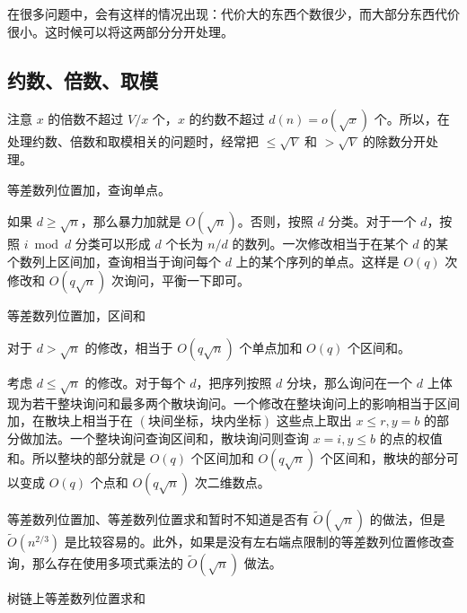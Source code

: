在很多问题中，会有这样的情况出现：代价大的东西个数很少，而大部分东西代价很小。这时候可以将这两部分分开处理。

\subsection{约数、倍数、取模}

注意 $x$ 的倍数不超过 $V/x$ 个，$x$ 的约数不超过 $d(n) = o(\sqrt x)$ 个。所以，在处理约数、倍数和取模相关的问题时，经常把 $\le \sqrt{V}$ 和 $>\sqrt{V}$ 的除数分开处理。

\begin{example}
    等差数列位置加，查询单点。
\end{example}
\begin{solution}
    如果 $d\ge \sqrt{n}$，那么暴力加就是 $O(\sqrt{n})$。否则，按照 $d$ 分类。对于一个 $d$，按照 $i\bmod d$ 分类可以形成 $d$ 个长为 $n/d$ 的数列。一次修改相当于在某个 $d$ 的某个数列上区间加，查询相当于询问每个 $d$ 上的某个序列的单点。这样是 $O(q)$ 次修改和 $O(q\sqrt{n})$ 次询问，平衡一下即可。
\end{solution}
\begin{example}[P5309 强化版]
    等差数列位置加，区间和
\end{example}
\begin{solution}
    对于 $d>\sqrt{n}$ 的修改，相当于 $O(q\sqrt{n})$ 个单点加和 $O(q)$ 个区间和。
    
    考虑 $d\le \sqrt{n}$ 的修改。对于每个 $d$，把序列按照 $d$ 分块，那么询问在一个 $d$ 上体现为若干整块询问和最多两个散块询问。一个修改在整块询问上的影响相当于区间加，在散块上相当于在 $(\text{块间坐标，块内坐标})$ 这些点上取出 $x\le r,y=b$ 的部分做加法。一个整块询问查询区间和，散块询问则查询 $x=i,y\le b$ 的点的权值和。所以整块的部分就是 $O(q)$ 个区间加和 $O(q\sqrt{n})$ 个区间和，散块的部分可以变成 $O(q)$ 个点和 $O(q\sqrt{n})$ 次二维数点。
\end{solution}
\begin{remark}
    等差数列位置加、等差数列位置求和暂时不知道是否有 $\tilde O(\sqrt{n})$ 的做法，但是 $\tilde O(n^{2/3})$ 是比较容易的。此外，如果是没有左右端点限制的等差数列位置修改查询，那么存在使用多项式乘法的 $\tilde O(\sqrt{n})$ 做法。
\end{remark}

\begin{example}[P3591]
    树链上等差数列位置求和
\end{example}

